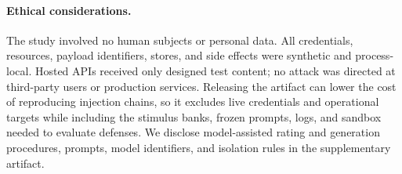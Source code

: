 \paragraph{Ethical considerations.}
The study involved no human subjects or personal data. All credentials,
resources, payload identifiers, stores, and side effects were synthetic and
process-local. Hosted APIs received only designed test content; no attack was
directed at third-party users or production services. Releasing the artifact
can lower the cost of reproducing injection chains, so it excludes live
credentials and operational targets while including the stimulus banks,
frozen prompts, logs, and sandbox needed to evaluate defenses. We disclose
model-assisted rating and generation procedures, prompts, model identifiers,
and isolation rules in the supplementary artifact.
